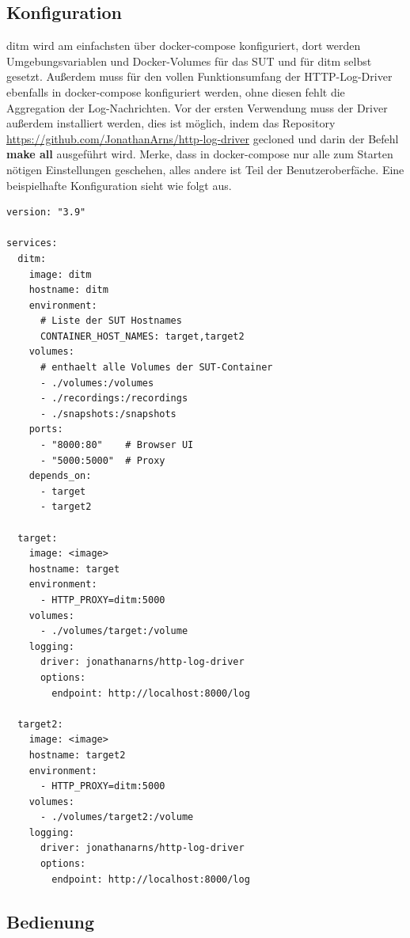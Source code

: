 \documentclass[12pt,a4paper]{report}
\begin{document}
\subsection{Konfiguration}
ditm wird am einfachsten über docker-compose konfiguriert, dort werden Umgebungsvariablen und Docker-Volumes für das SUT und für
ditm selbst gesetzt. Außerdem muss für den vollen Funktionsumfang der HTTP-Log-Driver ebenfalls in docker-compose konfiguriert
werden, ohne diesen fehlt die Aggregation der Log-Nachrichten. Vor der ersten Verwendung muss der Driver außerdem installiert
werden, dies ist möglich, indem das Repository \url{https://github.com/JonathanArns/http-log-driver} gecloned und darin der Befehl
\textbf{make all} ausgeführt wird. Merke, dass in docker-compose nur alle zum Starten nötigen Einstellungen geschehen, alles andere ist Teil
der Benutzeroberfäche. Eine beispielhafte Konfiguration sieht wie folgt aus.
\begin{lstlisting}
version: "3.9"

services:
  ditm:
    image: ditm
    hostname: ditm
    environment:
      # Liste der SUT Hostnames
      CONTAINER_HOST_NAMES: target,target2  
    volumes:
      # enthaelt alle Volumes der SUT-Container
      - ./volumes:/volumes  
      - ./recordings:/recordings
      - ./snapshots:/snapshots
    ports:
      - "8000:80"    # Browser UI
      - "5000:5000"  # Proxy
    depends_on:
      - target
      - target2
  
  target:
    image: <image>
    hostname: target
    environment: 
      - HTTP_PROXY=ditm:5000
    volumes:
      - ./volumes/target:/volume
    logging:
      driver: jonathanarns/http-log-driver
      options:
        endpoint: http://localhost:8000/log

  target2:
    image: <image>
    hostname: target2
    environment: 
      - HTTP_PROXY=ditm:5000
    volumes:
      - ./volumes/target2:/volume
    logging:
      driver: jonathanarns/http-log-driver
      options:
        endpoint: http://localhost:8000/log
\end{lstlisting}

\subsection{Bedienung}
\end{document}
